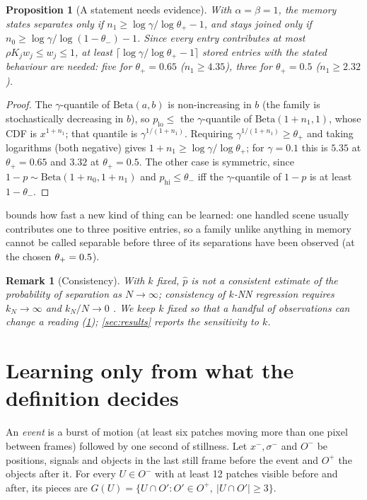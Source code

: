 \documentclass[10pt]{article}
\newtheorem{proposition}{Proposition}
\newtheorem{remark}{Remark}
\newcommand{\Beta}{\mathrm{Beta}}
\begin{document}
\begin{proposition}[A statement needs evidence]\label{prop:evidence}
With $\alpha=\beta=1$, the memory states \emph{separates} only if $n_1\ge\log\gamma/\log\theta_+-1$, and \emph{stays joined} only if $n_0\ge\log\gamma/\log(1-\theta_-)-1$. Since every entry contributes at most $\rho K_jw_j\le w_j\le1$, at least $\lceil\log\gamma/\log\theta_+-1\rceil$ stored entries with the stated behaviour are needed: five for $\theta_+=0.65$ ($n_1\ge4.35$), three for $\theta_+=0.5$ ($n_1\ge2.32$).
\end{proposition}
\begin{proof}
The $\gamma$-quantile of $\Beta(a,b)$ is non-increasing in $b$ (the family is stochastically decreasing in $b$), so $p_{\mathrm{lo}}\le$ the $\gamma$-quantile of $\Beta(1+n_1,1)$, whose CDF is $x^{1+n_1}$; that quantile is $\gamma^{1/(1+n_1)}$. Requiring $\gamma^{1/(1+n_1)}\ge\theta_+$ and taking logarithms (both negative) gives $1+n_1\ge\log\gamma/\log\theta_+$; for $\gamma=0.1$ this is $5.35$ at $\theta_+=0.65$ and $3.32$ at $\theta_+=0.5$. The other case is symmetric, since $1-p\sim\Beta(1+n_0,1+n_1)$ and $p_{\mathrm{hi}}\le\theta_-$ iff the $\gamma$-quantile of $1-p$ is at least $1-\theta_-$.
\end{proof}
 bounds how fast a new kind of thing can be learned: one handled scene usually contributes one to three positive entries, so a family unlike anything in memory cannot be called separable before three of its separations have been observed (at the chosen $\theta_+=0.5$).

\begin{remark}[Consistency]\label{rem:consistency}
With $k$ fixed, $\hat p$ is not a consistent estimate of the probability of separation as $N\to\infty$; consistency of $k$-NN regression requires $k_N\to\infty$ and $k_N/N\to0$ \citep{stone1977consistent}. We keep $k$ fixed so that a handful of observations can change a reading (\cref{prop:evidence}); \cref{sec:results} reports the sensitivity to $k$.
\end{remark}

\section{Learning only from what the definition decides}
\label{sec:learning}

An \emph{event} is a burst of motion (at least six patches moving more than one pixel between frames) followed by one second of stillness. Let $x^-,\sigma^-$ and $O^-$ be positions, signals and objects in the last still frame before the event and $O^+$ the objects after it. For every $U\in O^-$ with at least 12 patches visible before and after, its pieces are $G(U)=\{U\cap O':O'\in O^+,\ |U\cap O'|\ge3\}$.
\end{document}
